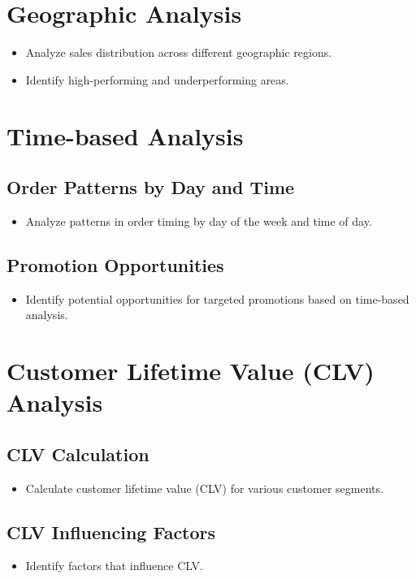 \documentclass{article}
\begin{document}
\section{Geographic Analysis}
    \begin{itemize}
        \item Analyze sales distribution across different geographic regions.
        \item Identify high-performing and underperforming areas.
    \end{itemize}

\section{Time-based Analysis}
    \subsection{Order Patterns by Day and Time}
    \begin{itemize}
        \item Analyze patterns in order timing by day of the week and time of day.
    \end{itemize}
    
    \subsection{Promotion Opportunities}
    \begin{itemize}
        \item Identify potential opportunities for targeted promotions based on time-based analysis.
    \end{itemize}

\section{Customer Lifetime Value (CLV) Analysis}
    \subsection{CLV Calculation}
    \begin{itemize}
        \item Calculate customer lifetime value (CLV) for various customer segments.
    \end{itemize}
    
    \subsection{CLV Influencing Factors}
    \begin{itemize}
        \item Identify factors that influence CLV.
    \end{itemize}
\end{document}
